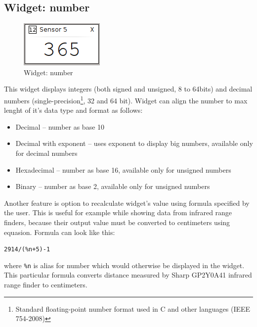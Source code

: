 \documentclass[12pt, a4paper, oneside]{article}
\begin{document}
\subsection{Widget: number}
\begin{figure}[h]
\begin{center}
\includegraphics[scale=1]{img/w_num.png}
\caption{Widget: number}
\end{center}
\end{figure}
This widget displays integers (both signed and unsigned, 8 to 64bits) and decimal numbers (single-precision\footnote{Standard floating-point number format used in C and other languages (IEEE 754-2008)}, 32 and 64 bit).
Widget can align the number to max lenght of it's data type and format as follows:
\begin{itemize}
    \item Decimal -- number as base 10
    \item Decimal with exponent -- uses exponent to display big numbers, available only for decimal numbers
    \item Hexadecimal -- number as base 16, available only for unsigned numbers
    \item Binary -- number as base 2, available only for unsigned numbers
\end{itemize}

Another feature is option to recalculate widget's value using formula specified by the user. This is useful for example while showing data from infrared range finders, because their output value must be converted to centimeters using equasion. Formula can look like this:
\begin{center}
\verb|2914/(%n+5)-1|
\end{center}
where \verb|%n| is alias for number which would otherwise be displayed in the widget. This particular formula converts distance measured by Sharp GP2Y0A41 infrared range finder to centimeters.
\end{document}
